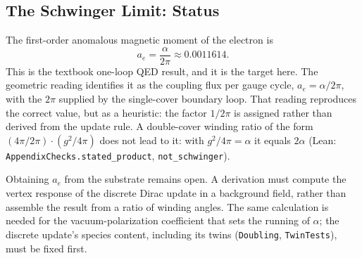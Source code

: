 \subsection{The Schwinger Limit: Status}
The first-order anomalous magnetic moment of the electron is
\begin{equation}
a_e = \frac{\alpha}{2\pi} \approx 0.0011614.
\end{equation}
This is the textbook one-loop QED result, and it is the target here. The geometric reading identifies it as the coupling flux per gauge cycle, $a_e=\alpha/2\pi$, with the $2\pi$ supplied by the single-cover boundary loop. That reading reproduces the correct value, but as a heuristic: the factor $1/2\pi$ is assigned rather than derived from the update rule. A double-cover winding ratio of the form $(4\pi/2\pi)\cdot(g^2/4\pi)$ does not lead to it: with $g^2/4\pi=\alpha$ it equals $2\alpha$ (Lean: \nolinkurl{AppendixChecks.stated_product}, \nolinkurl{not_schwinger}).

Obtaining $a_e$ from the substrate remains open. A derivation must compute the vertex response of the discrete Dirac update in a background field, rather than assemble the result from a ratio of winding angles. The same calculation is needed for the vacuum-polarization coefficient that sets the running of $\alpha$; the discrete update's species content, including its twins (\nolinkurl{Doubling}, \nolinkurl{TwinTests}), must be fixed first.
